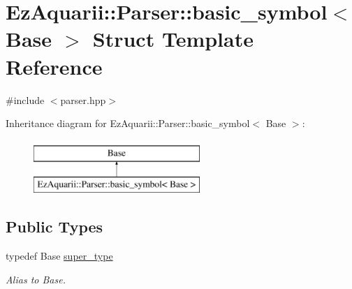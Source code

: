 \hypertarget{structEzAquarii_1_1Parser_1_1basic__symbol}{}\section{Ez\+Aquarii\+:\+:Parser\+:\+:basic\+\_\+symbol$<$ Base $>$ Struct Template Reference}
\label{structEzAquarii_1_1Parser_1_1basic__symbol}


{\ttfamily \#include $<$parser.\+hpp$>$}

Inheritance diagram for Ez\+Aquarii\+:\+:Parser\+:\+:basic\+\_\+symbol$<$ Base $>$\+:\begin{figure}[H]
\begin{center}
\leavevmode
\includegraphics[height=2.000000cm]{structEzAquarii_1_1Parser_1_1basic__symbol}
\end{center}
\end{figure}
\subsection*{Public Types}
\begin{DoxyCompactItemize}
\item 
typedef Base \hyperlink{structEzAquarii_1_1Parser_1_1basic__symbol_aaf4f23168a670058fa38f5aa15d65b75}{super\+\_\+type}\hypertarget{structEzAquarii_1_1Parser_1_1basic__symbol_aaf4f23168a670058fa38f5aa15d65b75}{}\label{structEzAquarii_1_1Parser_1_1basic__symbol_aaf4f23168a670058fa38f5aa15d65b75}

\begin{DoxyCompactList}\small\item\em Alias to Base. \end{DoxyCompactList}\end{DoxyCompactItemize}
